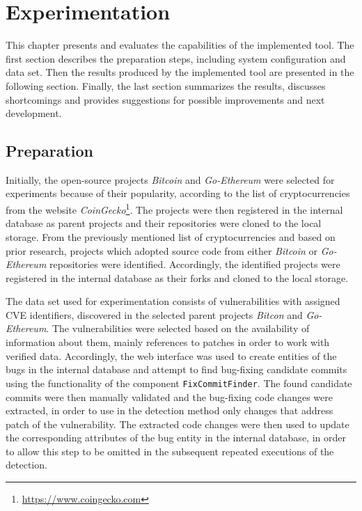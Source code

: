 
\newcommand{\stimes}{\ensuremath{\times}}

\chapter{Experimentation}
\label{chapter:experimentation}
This chapter presents and evaluates the capabilities of the implemented tool. The first section describes the preparation steps,
including system configuration and data set. Then the results produced by the implemented tool are presented in the following
section. Finally, the last section summarizes the results, discusses shortcomings and provides suggestions for possible
improvements and next development.

\section{Preparation}
Initially, the open-source projects \emph{Bitcoin} and \emph{Go-Ethereum} were selected for experiments because of their
popularity, according to the list of cryptocurrencies from the website \emph{CoinGecko}\footnote{\href{https://www.coingecko.com}
{https://www.coingecko.com}}.
The projects were then registered in the internal database as parent projects and their repositories were cloned to the local
storage. From the previously mentioned list of cryptocurrencies and based on prior research, projects which adopted source
code from either \emph{Bitcoin} or \emph{Go-Ethereum} repositories were identified. Accordingly, the identified projects were
registered in the internal database as their forks and cloned to the local storage.

The data set used for experimentation consists of vulnerabilities with assigned CVE identifiers, discovered in the selected parent
projects \emph{Bitcon} and \emph{Go-Ethereum}. The vulnerabilities were selected based on the availability of information about
them, mainly references to patches in order to work with verified data. Accordingly, the web interface was used to create
entities of the bugs in the internal database and attempt to find bug-fixing candidate commits using the functionality of the
component \texttt{FixCommitFinder}. The found candidate commits were then manually validated and the bug-fixing code changes were
extracted, in order to use in the detection method only changes that address patch of the vulnerability. The extracted code
changes were then used to update the corresponding attributes of the bug entity in the internal database, in order to allow
this step to be omitted in the subsequent repeated executions of the detection.

